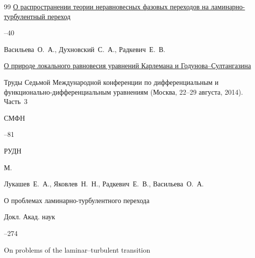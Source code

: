 \begin{thebibliography}{99}
\paper \href{https://elibrary.ru/item.asp?id=26711248}{О распространении теории неравновесных фазовых переходов на ламинарно-турбулентный переход}




--40









\by Васильева~О.~А., Духновский~С.~А., Радкевич~Е.~В.

\paper \href{http://mi.mathnet.ru/cmfd295}{О природе локального равновесия уравнений Карлемана и Годунова--Султангазина}

\inbook Труды Седьмой Международной конференции по дифференциальным и функционально-дифференциальным уравнениям \rm (Москва, 22--29 августа, 2014). Часть~3

\serial СМФН



--81

\publ РУДН

\publaddr М.






\by Лукашев~Е.~А., Яковлев~Н.~Н., Радкевич~Е.~В., Васильева~О.~А.

\paper О проблемах ламинарно-турбулентного перехода

\jour Докл. Акад. наук




--274


\transl

\paper On problems of the laminar–turbulent transition


\end{thebibliography}
